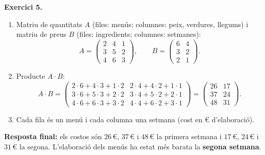 \documentclass[12pt,a4paper]{article}
\newcommand{\blocInici}{%
  \par\nobreak\vspace{0pt}%
  \begin{minipage}[t]{\linewidth}%
}
\newcommand{\blocFi}{%
  \end{minipage}%
  \par
}
\begin{document}
%
\blocInici
\noindent\textbf{Exercici 5.}
\begin{enumerate}[label=\arabic*.,leftmargin=1.2em,itemsep=0.35em]
  \item Matriu de quantitats $A$ (files: menús; columnes: peix, verdures, llegums)
    i matriu de preus $B$ (files: ingredients; columnes: setmanes):
    \[
      A =
      \begin{pmatrix}
        2 & 4 & 1 \\
        3 & 5 & 2 \\
        4 & 6 & 3
      \end{pmatrix},
      \qquad
      B =
      \begin{pmatrix}
        6 & 4 \\
        3 & 2 \\
        2 & 1
      \end{pmatrix}.
    \]
  \item Producte $A \cdot B$:
    \[
      A \cdot B =
      \begin{pmatrix}
        2\cdot 6 + 4\cdot 3 + 1\cdot 2 & 2\cdot 4 + 4\cdot 2 + 1\cdot 1 \\
        3\cdot 6 + 5\cdot 3 + 2\cdot 2 & 3\cdot 4 + 5\cdot 2 + 2\cdot 1 \\
        4\cdot 6 + 6\cdot 3 + 3\cdot 2 & 4\cdot 4 + 6\cdot 2 + 3\cdot 1
      \end{pmatrix}
      =
      \begin{pmatrix}
        26 & 17 \\
        37 & 24 \\
        48 & 31
      \end{pmatrix}.
    \]
  \item Cada fila és un menú i cada columna una setmana
    (cost en \euro{} d'elaboració).
\end{enumerate}
\textbf{Resposta final:}
els costos són $26$\,\euro{}, $37$\,\euro{} i $48$\,\euro{} la primera setmana
i $17$\,\euro{}, $24$\,\euro{} i $31$\,\euro{} la segona.
L'elaboració dels menús ha estat més barata la \textbf{segona setmana}.
\blocFi

\vspace{0.7em}
\end{document}
